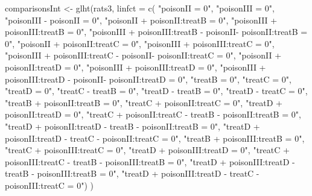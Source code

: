 \documentclass[
  dutch,
  letterpaper,
  12pt]{book}
\newenvironment{Shaded}{\begin{snugshade}}{\end{snugshade}}
\newcommand{\AttributeTok}[1]{\textcolor[rgb]{0.40,0.45,0.13}{#1}}
\newcommand{\FunctionTok}[1]{\textcolor[rgb]{0.28,0.35,0.67}{#1}}
\newcommand{\NormalTok}[1]{\textcolor[rgb]{0.00,0.23,0.31}{#1}}
\newcommand{\OtherTok}[1]{\textcolor[rgb]{0.00,0.23,0.31}{#1}}
\newcommand{\StringTok}[1]{\textcolor[rgb]{0.13,0.47,0.30}{#1}}
\theoremstyle{definition}
\theoremstyle{definition}
\theoremstyle{definition}
\theoremstyle{remark}
\begin{document}
\begin{Shaded}
\begin{Highlighting}[]
\NormalTok{comparisonsInt }\OtherTok{\textless{}{-}} \FunctionTok{glht}\NormalTok{(rats3, }\AttributeTok{linfct =} \FunctionTok{c}\NormalTok{(}
  \StringTok{"poisonII = 0"}\NormalTok{,}
  \StringTok{"poisonIII = 0"}\NormalTok{,}
  \StringTok{"poisonIII {-} poisonII = 0"}\NormalTok{,}
  \StringTok{"poisonII + poisonII:treatB = 0"}\NormalTok{,}
  \StringTok{"poisonIII + poisonIII:treatB = 0"}\NormalTok{,}
  \StringTok{"poisonIII + poisonIII:treatB {-} poisonII{-} poisonII:treatB = 0"}\NormalTok{,  }
  \StringTok{"poisonII + poisonII:treatC = 0"}\NormalTok{,}
  \StringTok{"poisonIII + poisonIII:treatC = 0"}\NormalTok{,}
  \StringTok{"poisonIII + poisonIII:treatC {-} poisonII{-} poisonII:treatC = 0"}\NormalTok{,  }
  \StringTok{"poisonII + poisonII:treatD = 0"}\NormalTok{,}
  \StringTok{"poisonIII + poisonIII:treatD = 0"}\NormalTok{,}
  \StringTok{"poisonIII + poisonIII:treatD {-} poisonII{-} poisonII:treatD = 0"}\NormalTok{,  }
  \StringTok{"treatB = 0"}\NormalTok{,}
  \StringTok{"treatC = 0"}\NormalTok{,}
  \StringTok{"treatD = 0"}\NormalTok{,}
  \StringTok{"treatC {-} treatB = 0"}\NormalTok{,}
  \StringTok{"treatD {-} treatB = 0"}\NormalTok{,}
  \StringTok{"treatD {-} treatC = 0"}\NormalTok{,}
  \StringTok{"treatB + poisonII:treatB = 0"}\NormalTok{,}
  \StringTok{"treatC + poisonII:treatC = 0"}\NormalTok{,}
  \StringTok{"treatD + poisonII:treatD = 0"}\NormalTok{,}
  \StringTok{"treatC + poisonII:treatC {-} treatB {-} poisonII:treatB = 0"}\NormalTok{,}
  \StringTok{"treatD + poisonII:treatD {-} treatB {-} poisonII:treatB = 0"}\NormalTok{,}
  \StringTok{"treatD + poisonII:treatD {-} treatC {-} poisonII:treatC = 0"}\NormalTok{,}
  \StringTok{"treatB + poisonIII:treatB = 0"}\NormalTok{,}
  \StringTok{"treatC + poisonIII:treatC = 0"}\NormalTok{,}
  \StringTok{"treatD + poisonIII:treatD = 0"}\NormalTok{,}
  \StringTok{"treatC + poisonIII:treatC {-} treatB {-} poisonIII:treatB = 0"}\NormalTok{,}
  \StringTok{"treatD + poisonIII:treatD {-} treatB {-} poisonIII:treatB = 0"}\NormalTok{,}
  \StringTok{"treatD + poisonIII:treatD {-} treatC {-} poisonIII:treatC = 0"}\NormalTok{)}
\NormalTok{)}


\end{Highlighting}
\end{Shaded}
\end{document}
